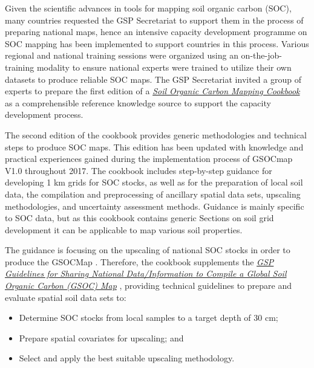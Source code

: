 \documentclass[10pt,b5paper,]{book}
\providecommand{\tightlist}{%
  \setlength{\itemsep}{0pt}\setlength{\parskip}{0pt}}
\theoremstyle{definition}
\theoremstyle{definition}
\theoremstyle{definition}
\theoremstyle{remark}
\begin{document}
Given the scientific advances in tools for mapping soil organic carbon
(SOC), many countries requested the GSP Secretariat to support them in
the process of preparing national maps, hence an intensive capacity
development programme on SOC mapping has been implemented to support
countries in this process. Various regional and national training
sessions were organized using an on-the-job-training modality to ensure
national experts were trained to utilize their own datasets to produce
reliable SOC maps. The GSP Secretariat invited a group of experts to
prepare the first edition of a
\href{http://www.fao.org/3/a-bs901e.pdf}{\emph{Soil Organic Carbon
Mapping Cookbook}} \citep{cookbook_2017} as a comprehensible reference
knowledge source to support the capacity development process.

The second edition of the cookbook provides generic methodologies and
technical steps to produce SOC maps. This edition has been updated with
knowledge and practical experiences gained during the implementation
process of GSOCmap V1.0 
throughout 2017. The cookbook includes step-by-step guidance for
developing 1 km grids for SOC stocks, as well as for the preparation of
local soil data, the compilation and preprocessing of ancillary spatial
data sets, upscaling methodologies, and uncertainty assessment methods.
Guidance is mainly specific to SOC data, but as this cookbook contains
generic Sections on soil grid development it can be applicable to map
various soil properties.

The guidance is focusing on the upscaling of national SOC stocks in
order to produce the GSOCMap
. Therefore, the
cookbook supplements the
\href{http://www.fao.org/3/a-bp164e.pdf}{\emph{GSP Guidelines for
Sharing National Data/Information to Compile a Global Soil Organic
Carbon (GSOC) Map}} \citep{gsp_guidelines_2017}, providing technical
guidelines to prepare and evaluate spatial soil data sets to:

\begin{itemize}
\tightlist
\item
  Determine SOC stocks from local samples to a target depth of 30 cm;
\item
  Prepare spatial covariates  for
  upscaling; and
\item
  Select and apply the best suitable upscaling methodology.
\end{itemize}
\end{document}
